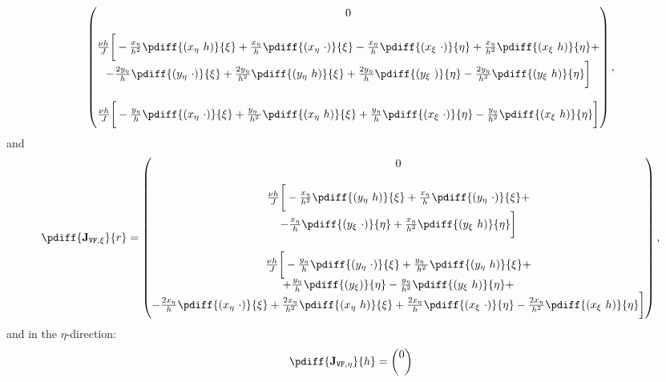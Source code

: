 {{\begin{align}
\begin{pmatrix}
	0 \\
	\\
	\frac{\nu h}{J} \bigg[
	-\frac{x_{\eta}}{h^2}\pdiff{(x_{\eta}\ h)}{\xi}
	+ \frac{x_{\eta}}{h} \pdiff{(x_{\eta}\ \cdot)}{\xi}
	- \frac{x_{\eta} }{h} \pdiff{(x_{\xi}\ \cdot)}{\eta}
	+ \frac{x_{\eta} }{h^2} \pdiff{ (x_{\xi}\ h)}{\eta} + \\
	- \frac{2 y_{\eta}}{h}  \pdiff{ (y_{\eta}\ \cdot)}{\xi}
	+ \frac{2 y_{\eta} }{h^2}  \pdiff{ (y_{\eta}\ h)}{\xi}
	+ \frac{2 y_{\eta}}{h}  \pdiff{(y_{\xi}\ )}{\eta}
	- \frac{2 y_{\eta} }{h^2} \pdiff{(y_{\xi}\ h)}{\eta}\bigg]
    \\
    \\
	\frac{\nu h}{J} \bigg[
	- \frac{y_{\eta}}{h} \pdiff{(x_{\eta}\ \cdot)}{\xi}
	+ \frac{y_{\eta}\ }{h^2} \pdiff{(x_{\eta}\ h)}{\xi}
	+\frac{y_{\eta}}{h}   \pdiff{(x_{\xi}\ \cdot)}{\eta}
	-\frac{y_{\eta}}{h^2}   \pdiff{(x_{\xi}\ h)}{\eta}\bigg]
\end{pmatrix},
\end{align}
%
and
%
\begin{align}
	\pdiff{\mathbf{J}_{\texttt{VF},\xi}}{r}=
		\begin{pmatrix}
	0 \\
	\\
	\frac{\nu h}{J} \bigg[
	- \frac{x_{\eta}}{h^2} \pdiff{(y_{\eta}\ h)}{\xi}
	+ \frac{x_{\eta}}{h} \pdiff{(y_{\eta}\ \cdot)}{\xi} + \\
	- \frac{x_{\eta} }{h} \pdiff{(y_{\xi}\ \cdot)}{\eta}
	+ \frac{x_{\eta}}{h^2} \pdiff{ (y_{\xi}\ h)}{\eta}\bigg]
    \\
    \\
	\frac{\nu h}{J} \bigg[
	- \frac{y_{\eta}}{h} \pdiff{(y_{\eta}\ \cdot)}{\xi}
	+ \frac{y_{\eta}\ }{h^2} \pdiff{(y_{\eta}\ h)}{\xi}
     + \\
	+ \frac{y_{\eta}}{h} \pdiff{(y_{\xi} )}{\eta}
	- \frac{y_{\eta}}{h^2} \pdiff{(y_{\xi}\ h)}{\eta} + \\
	- \frac{2 x_{\eta}}{h} \pdiff{(x_{\eta}\ \cdot)}{\xi}
	+ \frac{2 x_{\eta}}{h^2} \pdiff{(x_{\eta}\  h)}{\xi}
	+ \frac{2 x_{\eta}}{h}  \pdiff{(x_{\xi}\ \cdot)}{\eta}
	- \frac{2 x_{\eta}}{h^2}  \pdiff{(x_{\xi}\ h)}{\eta}\bigg]
\end{pmatrix} ,
\end{align}
%
and in the $\eta$-direction:
%
\begin{align}
	\pdiff{\mathbf{J}_{\texttt{VF},\eta}}{h}=
		\begin{pmatrix}
		0 \\
		\\

\end{pmatrix}
\end{align}}}
